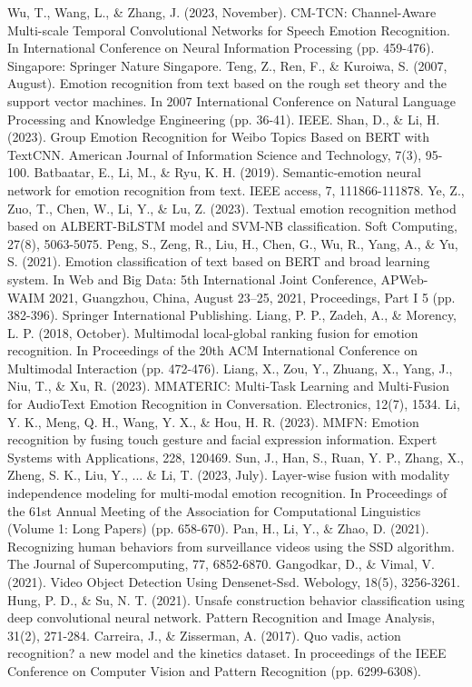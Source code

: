 \documentclass[preprint,12pt]{elsarticle}
\begin{document}
\begin{thebibliography}{99}
 Wu, T., Wang, L., \& Zhang, J. (2023, November). CM-TCN: Channel-Aware Multi-scale Temporal Convolutional Networks for Speech Emotion Recognition. In International Conference on Neural Information Processing (pp. 459-476). Singapore: Springer Nature Singapore.
 Teng, Z., Ren, F., \& Kuroiwa, S. (2007, August). Emotion recognition from text based on the rough set theory and the support vector machines. In 2007 International Conference on Natural Language Processing and Knowledge Engineering (pp. 36-41). IEEE.
 Shan, D., \& Li, H. (2023). Group Emotion Recognition for Weibo Topics Based on BERT with TextCNN. American Journal of Information Science and Technology, 7(3), 95-100.
 Batbaatar, E., Li, M., \& Ryu, K. H. (2019). Semantic-emotion neural network for emotion recognition from text. IEEE access, 7, 111866-111878.
 Ye, Z., Zuo, T., Chen, W., Li, Y., \& Lu, Z. (2023). Textual emotion recognition method based on ALBERT-BiLSTM model and SVM-NB classification. Soft Computing, 27(8), 5063-5075.
 Peng, S., Zeng, R., Liu, H., Chen, G., Wu, R., Yang, A., \& Yu, S. (2021). Emotion classification of text based on BERT and broad learning system. In Web and Big Data: 5th International Joint Conference, APWeb-WAIM 2021, Guangzhou, China, August 23–25, 2021, Proceedings, Part I 5 (pp. 382-396). Springer International Publishing.
 Liang, P. P., Zadeh, A., \& Morency, L. P. (2018, October). Multimodal local-global ranking fusion for emotion recognition. In Proceedings of the 20th ACM International Conference on Multimodal Interaction (pp. 472-476).
 Liang, X., Zou, Y., Zhuang, X., Yang, J., Niu, T., \& Xu, R. (2023). MMATERIC: Multi-Task Learning and Multi-Fusion for AudioText Emotion Recognition in Conversation. Electronics, 12(7), 1534.
 Li, Y. K., Meng, Q. H., Wang, Y. X., \& Hou, H. R. (2023). MMFN: Emotion recognition by fusing touch gesture and facial expression information. Expert Systems with Applications, 228, 120469.
 Sun, J., Han, S., Ruan, Y. P., Zhang, X., Zheng, S. K., Liu, Y., ... \& Li, T. (2023, July). Layer-wise fusion with modality independence modeling for multi-modal emotion recognition. In Proceedings of the 61st Annual Meeting of the Association for Computational Linguistics (Volume 1: Long Papers) (pp. 658-670).
 Pan, H., Li, Y., \& Zhao, D. (2021). Recognizing human behaviors from surveillance videos using the SSD algorithm. The Journal of Supercomputing, 77, 6852-6870.
 Gangodkar, D., \& Vimal, V. (2021). Video Object Detection Using Densenet-Ssd. Webology, 18(5), 3256-3261.
 Hung, P. D., \& Su, N. T. (2021). Unsafe construction behavior classification using deep convolutional neural network. Pattern Recognition and Image Analysis, 31(2), 271-284.
 Carreira, J., \& Zisserman, A. (2017). Quo vadis, action recognition? a new model and the kinetics dataset. In proceedings of the IEEE Conference on Computer Vision and Pattern Recognition (pp. 6299-6308).




\end{thebibliography}
\end{document}
